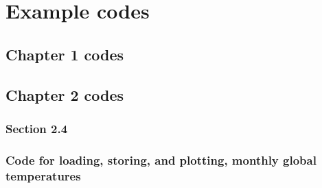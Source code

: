 \documentclass{tufte-book} %
\begin{document}
\chapter{Example codes}
\label{ch:11}


\newpage


\section{Chapter 1 codes}


\newpage


\section{Chapter 2 codes}


\subsection*{\textbf{Section 2.4}}

\subsection*{Code for loading, storing, and plotting, monthly global temperatures}
\end{document}
